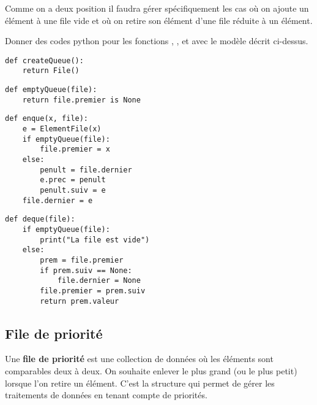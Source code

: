 Comme on a deux position il faudra gérer spécifiquement les cas où on ajoute un élément à une file vide et où on retire son élément d'une file réduite à un élément.
\begin{Exercise}[title = {Implémentations d'une file à l'aide d'objets}]\it 

Donner des codes python pour les fonctions  ,  ,   et  avec le modèle décrit ci-dessus.
\end{Exercise} 
\begin{Answer}
\begin{lstlisting}
def createQueue():
    return File()
\end{lstlisting}

\begin{lstlisting}
def emptyQueue(file):
    return file.premier is None
\end{lstlisting}

\begin{lstlisting}
def enque(x, file):
    e = ElementFile(x)
    if emptyQueue(file):
        file.premier = x
    else:
        penult = file.dernier
        e.prec = penult
        penult.suiv = e
    file.dernier = e
\end{lstlisting}
\newpage
\begin{lstlisting}
def deque(file):
    if emptyQueue(file):
        print("La file est vide")
    else:
        prem = file.premier
        if prem.suiv == None:
            file.dernier = None
        file.premier = prem.suiv
        return prem.valeur
\end{lstlisting}
\end{Answer}
\newpage
\subsection{File de priorité}
Une {\bf file de priorité} est une collection de données où les éléments sont comparables deux à deux. On souhaite enlever le plus grand (ou le plus petit) lorsque l'on retire un élément.
C'est la structure qui permet de gérer les traitements de données en tenant compte de priorités.

